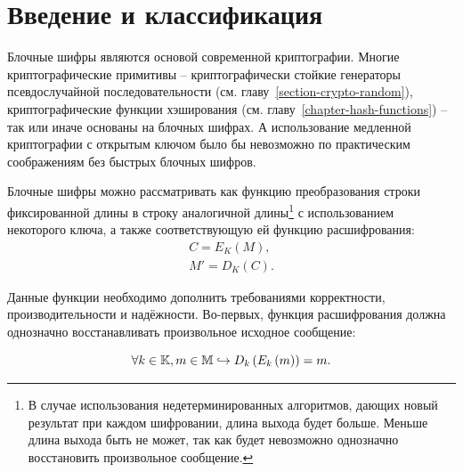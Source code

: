 \section{Введение и классификация}\label{section-block-ciphers-intro}

Блочные шифры являются основой современной криптографии. Многие криптографические примитивы -- криптографически стойкие генераторы псевдослучайной последовательности (см. главу~\ref{section-crypto-random}), криптографические функции хэширования (см. главу~\ref{chapter-hash-functions}) -- так или иначе основаны на блочных шифрах. А использование медленной криптографии с открытым ключом было бы невозможно по практическим соображениям без быстрых блочных шифров.

Блочные шифры можно рассматривать как функцию преобразования строки фиксированной длины в строку аналогичной длины\footnote{В случае использования недетерминированных алгоритмов, дающих новый результат при каждом шифровании, длина выхода будет больше. Меньше длина выхода быть не может, так как будет невозможно однозначно восстановить произвольное сообщение.} с использованием некоторого ключа, а также соответствующую ей функцию расшифрования:
\[\begin{array}{l}
	C = E_K\left( M \right), \\
	M'= D_K\left( C \right).
\end{array}\]

Данные функции необходимо дополнить требованиями корректности, производительности и надёжности. Во-первых, функция расшифрования должна однозначно восстанавливать произвольное исходное сообщение:

\[ \forall k \in \mathbb{K}, m \in \mathbb{M} \hookrightarrow D_k \left( E_k\left( m \right) \right) = m. \]

